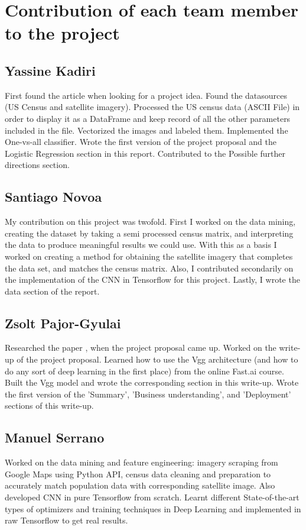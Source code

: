 \documentclass{article}
\begin{document}
\appendix
\section{Contribution of each team member to the project}
\subsection{Yassine Kadiri}
First found the article when looking for a project idea. Found the datasources (US Census and satellite imagery). Processed the US census data (ASCII File) in order to display it as a DataFrame and keep record of all the other parameters included in the file. Vectorized the images and labeled them. Implemented the One-vs-all classifier. Wrote the first version of the project proposal and the Logistic Regression section in this report. Contributed to the Possible further directions section.
\subsection{Santiago Novoa}
My contribution on this project was twofold.
First I worked on the data mining, creating the dataset by taking a semi processed census matrix, and interpreting the data to produce meaningful results we could use. With this as a basis I worked on creating a method for obtaining the satellite imagery that completes the data set, and matches the census matrix.
Also, I contributed secondarily on the implementation of the CNN in Tensorflow for this project. Lastly, I wrote the data section of the report.
\subsection{Zsolt Pajor-Gyulai}
Researched the paper \cite{RHD17}, when the project proposal came up. Worked on the write-up of the project proposal. Learned how to use the Vgg architecture (and how to do any sort of deep learning in the first place) from the online Fast.ai course. Built the Vgg model and wrote the corresponding section in this write-up. Wrote the first version of the 'Summary', 'Business understanding', and 'Deployment' sections of this write-up.

\subsection{Manuel Serrano}
Worked on the data mining and feature engineering: imagery scraping from Google Maps using Python API, census data cleaning and preparation to accurately match population data with corresponding satellite image. Also developed CNN in pure Tensorflow from scratch. Learnt different State-of-the-art types of optimizers and training techniques in Deep Learning and implemented in raw Tensorflow to get real results.
\end{document}
